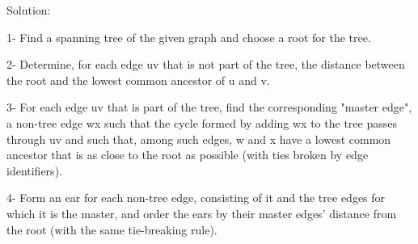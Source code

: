 Solution:

1- Find a spanning tree of the given graph and choose a root for the tree.

2- Determine, for each edge uv that is not part of the tree, the distance between the root and the lowest common ancestor of u and v.

3- For each edge uv that is part of the tree, find the corresponding "master edge", a non-tree edge wx such that the cycle formed by adding wx to the tree passes through uv and such that, among such edges, w and x have a lowest common ancestor that is as close to the root as possible (with ties broken by edge identifiers).

4- Form an ear for each non-tree edge, consisting of it and the tree edges for which it is the master, and order the ears by their master edges' distance from the root (with the same tie-breaking rule).
